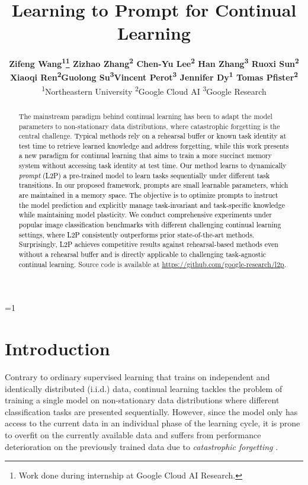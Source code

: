 \documentclass[10pt,twocolumn,letterpaper]{article}
\newcommand{\zizhaoz}[1]{\textcolor{black}{#1}}
\newcommand{\zifeng}[1]{\textcolor{black}{#1}}
\newcommand{\methodabbr}{L2P\xspace}
\newcounter{alphasect}
\def\alphainsection{0}
\let\oldsection=\section
\def\section{%
  \ifnum\alphainsection=1%
    \addtocounter{alphasect}{1}
  \fi%
\oldsection}%
\begin{document}
\title{Learning to Prompt for Continual Learning}
\author{\textbf{Zifeng Wang\textsuperscript{1}\thanks{Work done during internship at Google Cloud AI Research.} \quad  Zizhao Zhang\textsuperscript{2} \quad  Chen-Yu Lee\textsuperscript{2} \quad  Han Zhang\textsuperscript{3} \quad Ruoxi Sun\textsuperscript{2}} \\ 
\textbf{Xiaoqi Ren\textsuperscript{2}\quad Guolong Su\textsuperscript{3}\quad Vincent Perot\textsuperscript{3} \quad Jennifer Dy\textsuperscript{1} \quad Tomas Pfister\textsuperscript{2}} \\
\textsuperscript{1}Northeastern University \quad \textsuperscript{2}Google Cloud AI
\quad \textsuperscript{3}Google Research}
\maketitle

\begin{abstract}
The mainstream paradigm behind continual learning has been to adapt the model parameters to non-stationary data distributions, where catastrophic forgetting is the central challenge. \zizhaoz{Typical methods rely on a rehearsal buffer or known task identity at test time to retrieve learned knowledge and address forgetting, while this work presents a new paradigm for continual learning that aims to train a more succinct memory system without accessing task identity at test time. Our method learns to dynamically \emph{prompt} (\methodabbr) a pre-trained model to learn tasks sequentially under different task transitions.}
\zizhaoz{In our proposed framework, prompts are small learnable parameters, which are maintained in a memory space.
The objective is to optimize prompts to instruct the model prediction and explicitly manage task-invariant and task-specific knowledge while maintaining model plasticity.}
\zifeng{We conduct comprehensive experiments under popular image classification benchmarks with different challenging continual learning settings, where \methodabbr consistently outperforms prior state-of-the-art methods. Surprisingly, \methodabbr  achieves competitive results against rehearsal-based methods even without a rehearsal buffer and is directly applicable to challenging task-agnostic continual learning. %
}
Source code is available at \url{https://github.com/google-research/l2p}. %
\end{abstract}
\vspace{-0.3cm}

\section{Introduction}
Contrary to ordinary supervised learning that trains on independent and identically distributed (i.i.d.) data, continual learning tackles the problem of training a single model on non-stationary data distributions where different classification tasks are presented sequentially.
However, since the model only has access to the current data in an individual phase of the learning cycle, it is prone to overfit on the currently available data and suffers from performance deterioration on the previously trained data due to \emph{catastrophic forgetting} \cite{mccloskey1989catastrophic}. 
\end{document}
